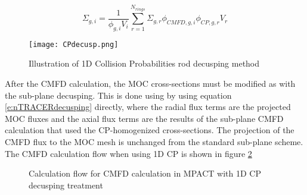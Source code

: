 \begin{equation}\label{e:CPMxs}
\Sigma_{g,i}=\frac{1}{\phi_{g,i}V_i}\sum_{r=1}^{N_{rings}} \Sigma_{g,r} \phi_{CMFD,g,i} \phi_{CP,g,r} V_r
\end{equation}

\begin{figure}
  \centering
  \texttt{[image: CPdecusp.png]}
  \caption[Collision Probabilities Decusping]{Illustration of 1D Collision Probabilities rod decusping method}\label{f:CPdecusp}
\end{figure}

After the CMFD calculation, the MOC cross-sections must be modified as with the sub-plane decusping.  This is done using by using equation \ref{e:nTRACERdecusping} directly, where the radial flux terms are the projected MOC fluxes and the axial flux terms are the results of the sub-plane CMFD calculation that used the CP-homogenized cross-sections.  The projection of the CMFD flux to the MOC mesh is unchanged from the standard sub-plane scheme.  The CMFD calculation flow when using 1D CP is shown in figure \ref{f:1dcpm-flowchart}

\begin{figure}
  \centering
  
  \caption[Stuff]{Calculation flow for CMFD calculation in MPACT with 1D CP decusping treatment}\label{f:1dcpm-flowchart}
\end{figure}